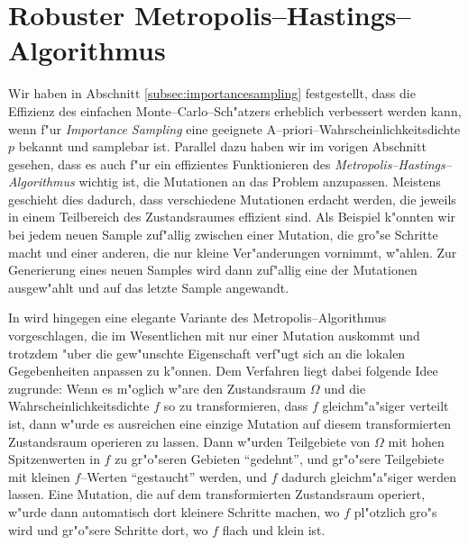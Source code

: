	\section{Robuster Metropolis--Hastings--Algorithmus}
	Wir haben in Abschnitt \ref{subsec:importancesampling} festgestellt, dass die Effizienz des einfachen Monte--Carlo--Sch"atzers erheblich verbessert werden kann, wenn f"ur {\em Importance Sampling} eine geeignete A--priori--Wahrscheinlichkeitsdichte $p$ bekannt und samplebar ist. Parallel dazu haben wir im vorigen Abschnitt gesehen, dass es auch f"ur ein effizientes Funktionieren des {\em Metropolis--Hastings--Algorithmus} wichtig ist, die Mutationen an das Problem anzupassen. Meistens geschieht dies dadurch, dass verschiedene Mutationen erdacht werden, die jeweils in einem Teilbereich des Zustandsraumes effizient sind. Als Beispiel k"onnten wir bei jedem neuen Sample zuf"allig zwischen einer Mutation, die gro"se Schritte macht und einer anderen, die nur kleine Ver"anderungen vornimmt, w"ahlen. Zur Generierung eines neuen Samples wird dann zuf"allig eine der Mutationen ausgew"ahlt und auf das letzte Sample angewandt.
	
	In \citep{Kelemen:2002p8514} wird hingegen eine elegante Variante des Metropolis--Algorithmus vorgeschlagen, die im Wesentlichen mit nur einer Mutation auskommt und trotzdem "uber die gew"unschte Eigenschaft verf"ugt sich an die lokalen Gegebenheiten anpassen zu k"onnen. Dem Verfahren liegt dabei folgende Idee zugrunde: Wenn es m"oglich w"are den Zustandsraum $\Omega$ und die Wahrscheinlichkeitsdichte $f$ so zu transformieren, 	dass $f$ gleichm"a"siger verteilt ist, dann w"urde es ausreichen eine einzige Mutation auf diesem transformierten Zustandsraum operieren zu lassen. Dann w"urden Teilgebiete von $\Omega$ mit hohen Spitzenwerten in $f$ zu gr"o"seren Gebieten ``gedehnt'', und gr"o"sere Teilgebiete mit kleinen $f$--Werten ``gestaucht'' werden, und $f$ dadurch gleichm"a"siger werden lassen. Eine Mutation, die auf dem transformierten Zustandsraum operiert, w"urde dann automatisch dort kleinere Schritte machen, wo $f$ pl"otzlich gro"s wird und gr"o"sere Schritte dort, wo $f$ flach und klein ist.
	
